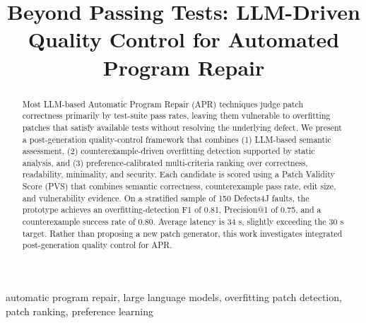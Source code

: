 \documentclass[conference]{IEEEtran}
\begin{document}
\title{Beyond Passing Tests: LLM-Driven Quality Control for Automated Program Repair}

\author{
\and
{}
\and


}

\maketitle

\begin{abstract}
Most LLM-based Automatic Program Repair (APR) techniques judge patch correctness primarily by test-suite pass rates, leaving them vulnerable to overfitting patches that satisfy available tests without resolving the underlying defect. We present a post-generation quality-control framework that combines (1) LLM-based semantic assessment, (2) counterexample-driven overfitting detection supported by static analysis, and (3) preference-calibrated multi-criteria ranking over correctness, readability, minimality, and security. Each candidate is scored using a Patch Validity Score (PVS) that combines semantic correctness, counterexample pass rate, edit size, and vulnerability evidence. On a stratified sample of 150 Defects4J faults, the prototype achieves an overfitting-detection F1 of 0.81, Precision@1 of 0.75, and a counterexample success rate of 0.80. Average latency is 34 s, slightly exceeding the 30 s target. Rather than proposing a new patch generator, this work investigates integrated post-generation quality control for APR.
\end{abstract}

\begin{IEEEkeywords}
automatic program repair, large language models, overfitting patch detection, patch ranking, preference learning
\end{IEEEkeywords}
\end{document}
